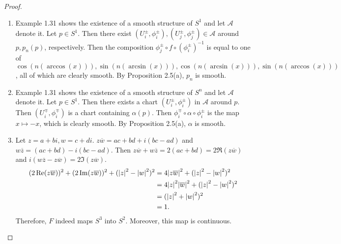 \begin{proof}
  $ $
  \begin{enumerate}[label=(\alph*)]
    \item 
      Example 1.31 shows the existence of a smooth structure of $S^1$ and let $\mathcal{A}$ denote it.
      Let $p \in S^1$.
      Then there exist $(U_i^{\pm}, \phi_i^{\pm}), (U_j^{\pm}, \phi_j^{\pm}) \in \mathcal{A}$ around $p, p_n(p)$, respectively.
      Then the composition $\phi_j^{\pm} \circ f \circ (\phi_i^{\pm})^{-1}$ is equal to one of $\cos(n(\arccos(x))), \sin(n(\arcsin(x))), \cos(n(\arcsin(x))), \sin(n(\arccos(x)))$, all of which are clearly smooth.
      By Proposition 2.5(a), $p_n$ is smooth.
    \item
      Example 1.31 shows the existence of a smooth structure of $S^n$ and let $\mathcal{A}$ denote it.
      Let $p \in S^1$.
      Then there exists a chart $(U_i^{\pm}, \phi_i^{\pm})$ in $\mathcal{A}$ around $p$.
      Then $(U_i^{\mp}, \phi_i^{\mp})$ is a chart containing $\alpha(p)$.
      Then $\phi_i^{\mp} \circ \alpha \circ \phi_i^{\pm}$ is the map $x \mapsto -x$, which is clearly smooth.
      By Proposition 2.5(a), $\alpha$ is smooth.
    \item
      Let $z = a + bi, w = c + di$.
      $z\overline{w} = ac + bd + i(bc - ad)$ and $w\overline{z} = (ac + bd) - i(bc - ad)$.
      Then $z\overline{w} + w\overline{z} = 2(ac + bd) = 2\Re(z\overline{w})$ and $i(w\overline{z} - z\overline{w}) = 2\Im(z\overline{w})$.
      \begin{align*}
        (2\Re(z\overline{w}))^2 + (2\Im(z\overline{w}))^2 + (\abs{z}^2 - \abs{w}^2)^2
          &= 4\abs{z\overline{w}}^2 + (\abs{z}^2 - \abs{w}^2)^2 \\
          &= 4\abs{z}^2\abs{\overline{w}}^2 + (\abs{z}^2 - \abs{w}^2)^2 \\
          &= (\abs{z}^2 + \abs{w}^2)^2 \\
          &= 1.
      \end{align*}
      Therefore, $F$ indeed maps $S^3$ into $S^2$.
      Moreover, this map is continuous.
  \end{enumerate}
\end{proof}

